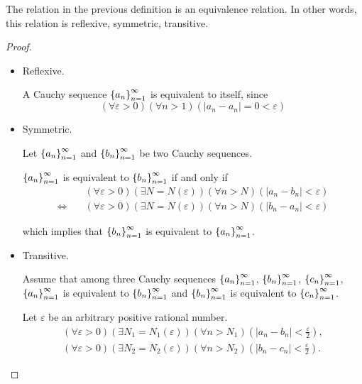 \begin{theorem}
    The relation in the previous definition is an equivalence relation. In other words, this relation is reflexive, symmetric, transitive.
\end{theorem}

\begin{proof}
    \begin{itemize}
        \item Reflexive.

              A Cauchy sequence ${\left\{{a_{n}}\right\}}^{\infty}_{n=1}$ is equivalent to itself, since
              \[
                  (\forall\varepsilon > 0)(\forall n > 1)(\left\vert a_{n} - a_{n} \right\vert = 0 < \varepsilon)
              \]
        \item Symmetric.

              Let ${\left\{{a_{n}}\right\}}^{\infty}_{n=1}$ and ${\left\{{b_{n}}\right\}}^{\infty}_{n=1}$ be two Cauchy sequences.

              ${\left\{{a_{n}}\right\}}^{\infty}_{n=1}$ is equivalent to ${\left\{{b_{n}}\right\}}^{\infty}_{n=1}$ if and only if
              \[
                  \begin{split}
                      & (\forall\varepsilon > 0)(\exists N=N(\varepsilon))(\forall n > N)(\left\vert a_{n} - b_{n} \right\vert < \varepsilon) \\
                      \Leftrightarrow\quad & (\forall\varepsilon > 0)(\exists N=N(\varepsilon))(\forall n > N)(\left\vert b_{n} - a_{n} \right\vert < \varepsilon)
                  \end{split}
              \]

              which implies that ${\left\{{b_{n}}\right\}}^{\infty}_{n=1}$ is equivalent to ${\left\{{a_{n}}\right\}}^{\infty}_{n=1}$.
        \item Transitive.

              Assume that among three Cauchy sequences ${\left\{{a_{n}}\right\}}^{\infty}_{n=1}$, ${\left\{{b_{n}}\right\}}^{\infty}_{n=1}$, ${\left\{{c_{n}}\right\}}^{\infty}_{n=1}$, ${\left\{{a_{n}}\right\}}^{\infty}_{n=1}$ is equivalent to ${\left\{{b_{n}}\right\}}^{\infty}_{n=1}$ and ${\left\{{b_{n}}\right\}}^{\infty}_{n=1}$ is equivalent to ${\left\{{c_{n}}\right\}}^{\infty}_{n=1}$.

              Let $\varepsilon$ be an arbitrary positive rational number.
              \[
                  \begin{split}
                      (\forall\varepsilon > 0)(\exists N_{1}=N_{1}(\varepsilon))(\forall n > N_{1})\left(\left\vert a_{n} - b_{n} \right\vert < \frac{\varepsilon}{2}\right), \\
                      (\forall\varepsilon > 0)(\exists N_{2}=N_{2}(\varepsilon))(\forall n > N_{2})\left(\left\vert b_{n} - c_{n} \right\vert < \frac{\varepsilon}{2}\right).
                  \end{split}
              \]


\end{itemize}
\end{proof}
